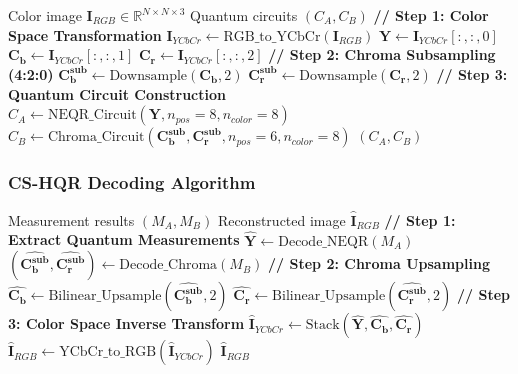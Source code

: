 \documentclass[11pt,a4paper]{article}
\begin{document}
\begin{algorithm}[H]
\caption{CS-HQR Encoding}
\label{alg:cshqr_encode}
\begin{algorithmic}[1]
\REQUIRE Color image $\mathbf{I}_{RGB} \in \mathbb{R}^{N \times N \times 3}$
\ENSURE Quantum circuits $(C_A, C_B)$
\STATE \textbf{// Step 1: Color Space Transformation}
\STATE $\mathbf{I}_{YCbCr} \leftarrow \text{RGB\_to\_YCbCr}(\mathbf{I}_{RGB})$
\STATE $\mathbf{Y} \leftarrow \mathbf{I}_{YCbCr}[:,:,0]$ 
\STATE $\mathbf{C_b} \leftarrow \mathbf{I}_{YCbCr}[:,:,1]$ 
\STATE $\mathbf{C_r} \leftarrow \mathbf{I}_{YCbCr}[:,:,2]$ 
\STATE
\STATE \textbf{// Step 2: Chroma Subsampling (4:2:0)}
\STATE $\mathbf{C_b^{sub}} \leftarrow \text{Downsample}(\mathbf{C_b}, 2)$ 
\STATE $\mathbf{C_r^{sub}} \leftarrow \text{Downsample}(\mathbf{C_r}, 2)$
\STATE
\STATE \textbf{// Step 3: Quantum Circuit Construction}
\STATE $C_A \leftarrow \text{NEQR\_Circuit}(\mathbf{Y}, n_{pos}=8, n_{color}=8)$
\STATE $C_B \leftarrow \text{Chroma\_Circuit}(\mathbf{C_b^{sub}}, \mathbf{C_r^{sub}}, n_{pos}=6, n_{color}=8)$
\STATE
\RETURN $(C_A, C_B)$
\end{algorithmic}
\end{algorithm}

\vspace{0.5em}

\subsubsection{CS-HQR Decoding Algorithm}

\vspace{0.3em}

\begin{algorithm}[H]
\caption{CS-HQR Decoding}
\label{alg:cshqr_decode}
\begin{algorithmic}[1]
\REQUIRE Measurement results $(M_A, M_B)$
\ENSURE Reconstructed image $\hat{\mathbf{I}}_{RGB}$
\STATE \textbf{// Step 1: Extract Quantum Measurements}
\STATE $\hat{\mathbf{Y}} \leftarrow \text{Decode\_NEQR}(M_A)$
\STATE $(\hat{\mathbf{C_b^{sub}}}, \hat{\mathbf{C_r^{sub}}}) \leftarrow \text{Decode\_Chroma}(M_B)$
\STATE
\STATE \textbf{// Step 2: Chroma Upsampling}
\STATE $\hat{\mathbf{C_b}} \leftarrow \text{Bilinear\_Upsample}(\hat{\mathbf{C_b^{sub}}}, 2)$
\STATE $\hat{\mathbf{C_r}} \leftarrow \text{Bilinear\_Upsample}(\hat{\mathbf{C_r^{sub}}}, 2)$
\STATE
\STATE \textbf{// Step 3: Color Space Inverse Transform}
\STATE $\hat{\mathbf{I}}_{YCbCr} \leftarrow \text{Stack}(\hat{\mathbf{Y}}, \hat{\mathbf{C_b}}, \hat{\mathbf{C_r}})$
\STATE $\hat{\mathbf{I}}_{RGB} \leftarrow \text{YCbCr\_to\_RGB}(\hat{\mathbf{I}}_{YCbCr})$
\STATE
\RETURN $\hat{\mathbf{I}}_{RGB}$
\end{algorithmic}
\end{algorithm}
\end{document}
